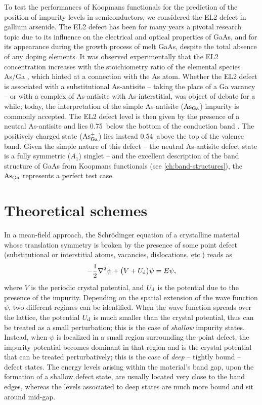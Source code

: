To test the performances of Koopmans functionals for the prediction of the position of impurity levels in semiconductors, we considered the EL2 defect in gallium arsenide. The EL2 defect has been for many years a pivotal research topic due to its influence on the electrical and optical properties of GaAs, and for its appearance during the growth process of melt GaAs, despite the total absence of any doping elements. It was observed experimentally that the EL2 concentration increases with the stoichiometry ratio of the elemental species As/Ga \cite{kaminska_el2_1987}, which hinted at a connection with the As atom. Whether the EL2 defect is associated with a substitutional As-antisite -- taking the place of a Ga vacancy -- or with a complex of As-antisite with As-interstitial, was object of debate for a while; today, the interpretation of the simple As-antisite ($\rm As_{Ga}$) impurity is commonly accepted. The EL2 defect level is then given by the presence of a neutral As-antisite and lies 0.75~\mev below the bottom of the conduction band \cite{kaminska_el2_1987,dabrowski_isolated_1989}. The positively charged state ($\rm As_{Ga}^+$) lies instead 0.54~\mev above the top of the valence band. Given the simple nature of this defect -- the neutral As-antisite defect state is a fully symmetric ($A_1$) singlet -- and the excellent description of the band structure of GaAs from Koopmans functionals (see \cref{ch:band-structures}), the $\rm As_{Ga}$ represents a perfect test case.

\section{Theoretical schemes\label{sec:theory-defects}}
In a mean-field approach, the Schr\"{o}dinger equation of a crystalline material whose translation symmetry is broken by the presence of some point defect (substitutional or interstitial atoms, vacancies, dislocations, etc.) reads as
%
\begin{equation}
    -\frac{1}{2} \nabla^2 \psi + \big( V + U_{\rm d } \big) \psi = E \psi ,
    \label{eq:schrodinger-eq-defects}
\end{equation}
%
where $V$ is the periodic crystal potential, and $U_{\rm d}$ is the potential due to the presence of the impurity. Depending on the spatial extension of the wave function $\psi$, two different regimes can be identified. When the wave function spreads over the lattice, the potential $U_{\rm d}$ is much smaller than the crystal potential, thus can be treated as a small perturbation; this is the case of \emph{shallow} impurity states. Instead, when $\psi$ is localized in a small region surrounding the point defect, the impurity potential becomes dominant in that region and is the crystal potential that can be treated perturbatively; this is the case of \emph{deep} -- tightly bound -- defect states. The energy levels arising within the material's band gap, upon the formation of a shallow defect state, are usually located very close to the band edges, whereas the levels associated to deep states are much more bound and sit around mid-gap.

